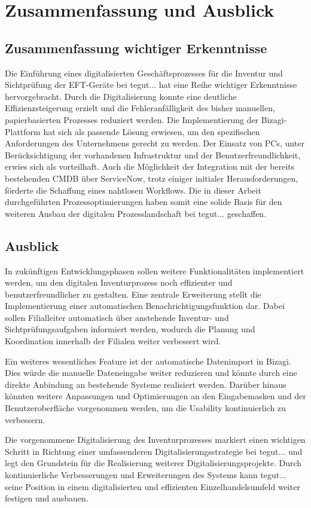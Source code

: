 \documentclass[12pt, a4paper]{article}
\begin{document}
\section{Zusammenfassung und Ausblick}

\subsection{Zusammenfassung wichtiger Erkenntnisse}
Die Einführung eines digitalisierten Geschäftsprozesses für die Inventur und Sichtprüfung der EFT-Geräte bei tegut... hat eine Reihe wichtiger Erkenntnisse hervorgebracht. 
Durch die Digitalisierung konnte eine deutliche Effizienzsteigerung erzielt und die Fehleranfälligkeit des bisher manuellen, papierbasierten Prozesses reduziert werden. 
Die Implementierung der Bizagi-Plattform hat sich als passende Lösung erwiesen, um den spezifischen Anforderungen des Unternehmens gerecht zu werden. Der Einsatz von PCs, 
unter Berücksichtigung der vorhandenen Infrastruktur und der Benutzerfreundlichkeit, erwies sich als vorteilhaft. Auch die Möglichkeit der Integration mit der bereits 
bestehenden CMDB über ServiceNow, trotz einiger initialer Herausforderungen, förderte die Schaffung eines nahtlosen Workflows. Die in dieser Arbeit durchgeführten 
Prozessoptimierungen haben somit eine solide Basis für den weiteren Ausbau der digitalen Prozesslandschaft bei tegut... geschaffen.

\subsection{Ausblick}
In zukünftigen Entwicklungsphasen sollen weitere Funktionalitäten implementiert werden, um den digitalen Inventurprozess noch effizienter und benutzerfreundlicher zu gestalten. 
Eine zentrale Erweiterung stellt die Implementierung einer automatischen Benachrichtigungsfunktion dar. Dabei sollen Filialleiter automatisch über anstehende Inventur- und 
Sichtprüfungsaufgaben informiert werden, wodurch die Planung und Koordination innerhalb der Filialen weiter verbessert wird. 

Ein weiteres wesentliches Feature ist der automatische Datenimport in Bizagi. Dies würde die manuelle Dateneingabe weiter reduzieren und könnte durch eine direkte 
Anbindung an bestehende Systeme realisiert werden. Darüber hinaus könnten weitere Anpassungen und Optimierungen an den Eingabemasken und der Benutzeroberfläche vorgenommen 
werden, um die Usability kontinuierlich zu verbessern.

Die vorgenommene Digitalisierung des Inventurprozesses markiert einen wichtigen Schritt in Richtung einer umfassenderen Digitalisierungsstrategie bei tegut... und legt den 
Grundstein für die Realisierung weiterer Digitalisierungsprojekte. Durch kontinuierliche Verbesserungen und Erweiterungen des Systems kann tegut... seine Position in einem 
digitalisierten und effizienten Einzelhandelsumfeld weiter festigen und ausbauen.
\end{document}
